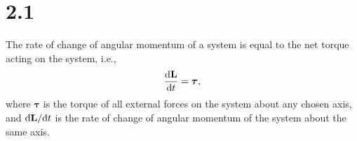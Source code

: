 \section{2.1}
\label{sec:2.1}


\begin{prin}
  \label{prin:angularMomentum}
  The rate of change of angular momentum of a system is equal to
  the net torque acting on the system,
  i.e.,
  \begin{equation}
    \frac{\mathrm{d} \mathbf{L}}{\mathrm{d} t} = \boldsymbol\tau,
  \end{equation}
  where $\boldsymbol\tau$ is the torque of all external forces on the system
  about any chosen axis,
  and $\mathrm{d} \mathbf{L}/\mathrm{d} t$ is the rate of change of
  angular momentum of the system about the same axis.
\end{prin}

